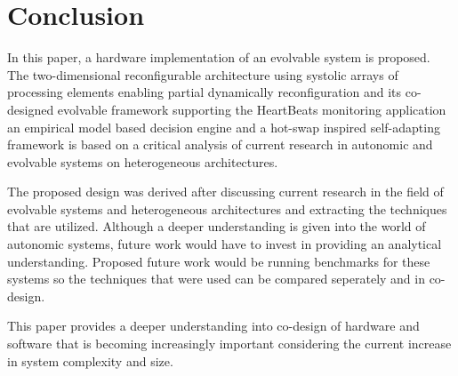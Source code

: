 
\section{Conclusion}
\label{sec:conclusion}
In this paper, a hardware implementation of an evolvable system is proposed. The two-dimensional reconfigurable architecture using systolic arrays of processing elements enabling partial dynamically reconfiguration and its co-designed evolvable framework supporting the HeartBeats monitoring application an empirical model based decision engine and a hot-swap inspired self-adapting framework is based on a critical analysis of current research in autonomic and evolvable systems on heterogeneous architectures. 

The proposed design was derived after discussing current research in the field of evolvable systems and heterogeneous architectures and extracting the techniques that are utilized. Although a deeper understanding is given into the world of autonomic systems, future work would have to invest in providing an analytical understanding. Proposed future work would be running benchmarks for these systems so the techniques that were used can be compared seperately and in co-design. 

This paper provides a deeper understanding into co-design of hardware and software that is becoming increasingly important considering the current increase in system complexity and size.